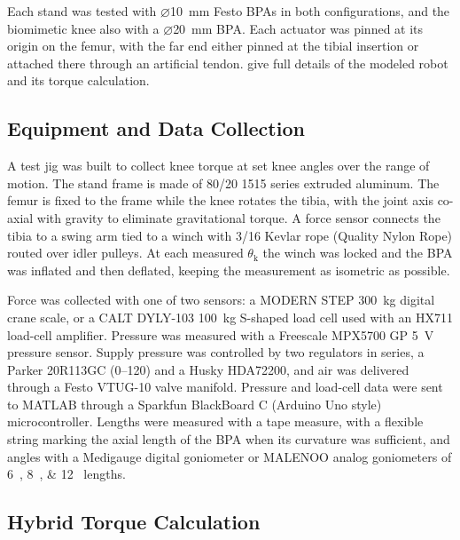Each stand was tested with $\diameter$\qty{10}{\mm} Festo BPAs in both configurations, and the biomimetic knee also with a $\diameter$\qty{20}{\mm} BPA. Each actuator was pinned at its origin on the femur, with the far end either pinned at the tibial insertion or attached there through an artificial tendon. \citet{bolen_determination_2019,morrow_optimization_2020} give full details of the modeled robot and its torque calculation.

\subsection{Equipment and Data Collection}\label{sec:torque_equipment}

A test jig was built to collect knee torque at set knee angles over the range of motion. The stand frame is made of 80/20 1515 series extruded aluminum. The femur is fixed to the frame while the knee rotates the tibia, with the joint axis co-axial with gravity to eliminate gravitational torque. A force sensor connects the tibia to a swing arm tied to a winch with \qty{3/16}{\inch} Kevlar rope (Quality Nylon Rope) routed over idler pulleys. At each measured $\theta_\text{k}$ the winch was locked and the BPA was inflated and then deflated, keeping the measurement as isometric as possible.

Force was collected with one of two sensors: a MODERN STEP \qty{300}{\kilo\gram} digital crane scale, or a CALT DYLY-103 \qty{100}{\kilo\gram} S-shaped load cell used with an HX711 load-cell amplifier. Pressure was measured with a Freescale MPX5700 GP \qty{5}{\volt} pressure sensor. Supply pressure was controlled by two regulators in series, a Parker 20R113GC (\qtyrange{0}{120}{\psi}) and a Husky HDA72200, and air was delivered through a Festo VTUG-10 valve manifold. Pressure and load-cell data were sent to MATLAB through a Sparkfun BlackBoard C (Arduino Uno style) microcontroller. Lengths were measured with a tape measure, with a flexible string marking the axial length of the BPA when its curvature was sufficient, and angles with a Medigauge digital goniometer or MALENOO analog goniometers of \qtylist{6;8;12}{\inch} lengths.

\subsection{Hybrid Torque Calculation}\label{sec:hybrid_method}

